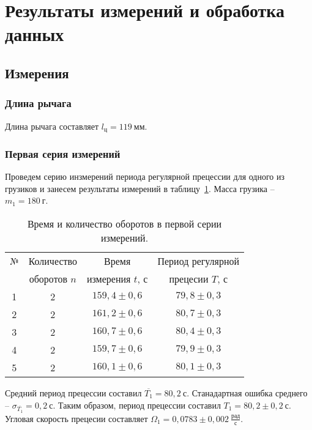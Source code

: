 \documentclass[a4paper,11pt]{article}
\begin{document}
\section{Результаты измерений и обработка данных}
\subsection{Измерения}
\subsubsection{Длина рычага}
Длина рычага составляет $l_{ц} = 119\ мм$.
\subsubsection{Первая серия измерений} %
Проведем серию инзмерений периода регулярной прецессии для одного из грузиков и занесем результаты измерений в таблицу~\ref{table:tab1}.\newline
Масса грузика -- $m_{1} = 180\ г$.
\begin{table}[h!]
\centering
\begin{tabular}{ ||c|c|c|c|| }
  \hline
  № & Количество & Время & Период регулярной \\
   & оборотов $n$ & измерения $t$, $с$ & прецесии $T$, $с$ \\
  \hline
  1 & 2 & $159,4 \pm 0,6$ & $79,8 \pm 0,3$ \\
  2 & 2 & $161,2 \pm 0,6$ & $80,7 \pm 0,3$ \\
  3 & 2 & $160,7 \pm 0,6$ & $80,4 \pm 0,3$ \\
  4 & 2 & $159,7 \pm 0,6$ & $79,9 \pm 0,3$ \\
  5 & 2 & $160,1 \pm 0,6$ & $80,1 \pm 0,3$ \\
  \hline
\end{tabular}
\caption{Время и количество оборотов в первой серии измерений.}
\label{table:tab1}
\end{table}\newline
Средний период прецессии составил $\overline{T_{1}} = 80,2\ с$.\newline
Станадартная ошибка среднего -- $\sigma_{\overline{T_{1}}}= 0,2\ с$.\newline
Таким образом, период прецессии составил $T_{1} = 80,2 \pm 0,2\ с$.\newline
Угловая скорость прецесии составляет $\Omega_{1} = 0,0783 \pm 0,002\ \frac{рад}{с}$.
\end{document}
